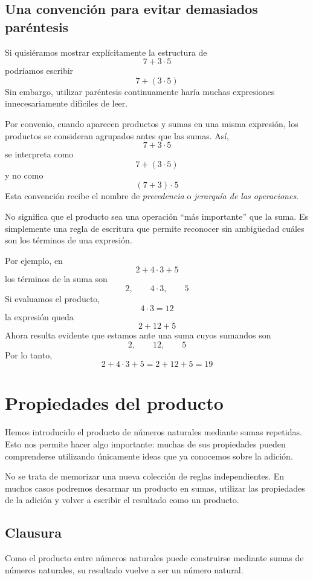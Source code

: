 \subsection{Una convención para evitar demasiados paréntesis}

Si quisiéramos mostrar explícitamente la estructura de
\[
7+3\cdot5
\]
podríamos escribir
\[
7+(3\cdot5)
\]
Sin embargo, utilizar paréntesis continuamente haría muchas expresiones innecesariamente difíciles de leer.

Por convenio, cuando aparecen productos y sumas en una misma expresión, los productos se consideran agrupados antes que las sumas. Así,
\[
7+3\cdot5
\]
se interpreta como
\[
7+(3\cdot5)
\]
y no como
\[
(7+3)\cdot5
\]
Esta convención recibe el nombre de \emph{precedencia} o \emph{jerarquía de las operaciones}.

No significa que el producto sea una operación ``más importante'' que la suma. Es simplemente una regla de escritura que permite reconocer sin ambigüedad cuáles son los términos de una expresión.

Por ejemplo, en
\[
2+4\cdot3+5
\]
los términos de la suma son
\[
2,\qquad4\cdot3,\qquad5
\]
Si evaluamos el producto,
\[
4\cdot3=12
\]
la expresión queda
\[
2+12+5
\]
Ahora resulta evidente que estamos ante una suma cuyos sumandos son
\[
2,\qquad12,\qquad5
\]
Por lo tanto,
\[
2+4\cdot3+5
=
2+12+5
=
19
\]

\section{Propiedades del producto}

Hemos introducido el producto de números naturales mediante sumas repetidas. Esto nos permite hacer algo importante: muchas de sus propiedades pueden comprenderse utilizando únicamente ideas que ya conocemos sobre la adición.

No se trata de memorizar una nueva colección de reglas independientes. En muchos casos podremos desarmar un producto en sumas, utilizar las propiedades de la adición y volver a escribir el resultado como un producto.

\subsection{Clausura}

Como el producto entre números naturales puede construirse mediante sumas de números naturales, su resultado vuelve a ser un número natural.

